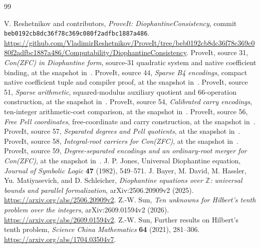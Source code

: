 \documentclass[11pt,a4paper]{article}
\theoremstyle{definition}\newtheorem{definition}[theorem]{Definition}
\theoremstyle{remark}\newtheorem{remark}[theorem]{Remark}
\begin{document}
\begin{thebibliography}{99}
\raggedright
{}
V. Reshetnikov and contributors,
\emph{ProveIt: DiophantineConsistency}, commit
\texttt{beb0192cb8dc36f78c369c080f2adfbc1887a486}.
\url{https://github.com/VladimirReshetnikov/ProveIt/tree/beb0192cb8dc36f78c369c080f2adfbc1887a486/Computability/DiophantineConsistency}.
ProveIt, source 31, \emph{Con(ZFC) in Diophantine form}, source-31
quadratic system and native coefficient binding, at the snapshot in~\cite{repo}.
ProveIt, source 44, \emph{Sparse B4 encodings}, compact native coefficient
tuple and compiler proof, at the snapshot in~\cite{repo}.
ProveIt, source 51, \emph{Sparse arithmetic}, squared-modulus auxiliary
quotient and 66-operation construction, at the snapshot in~\cite{repo}.
ProveIt, source 54, \emph{Calibrated carry encodings}, ten-integer
arithmetic-cost comparison, at the snapshot in~\cite{repo}.
ProveIt, source 56, \emph{Free Pell coordinates}, free-coordinate and
carry construction, at the snapshot in~\cite{repo}.
ProveIt, source 57, \emph{Separated degrees and Pell quotients},
at the snapshot in~\cite{repo}.
ProveIt, source 58, \emph{Integral-root carriers for Con(ZFC)},
at the snapshot in~\cite{repo}.
ProveIt, source 59, \emph{Degree-separated encodings and an ordinary-root
merger for Con(ZFC)}, at the snapshot in~\cite{repo}.
J. P. Jones, Universal Diophantine equation,
\emph{Journal of Symbolic Logic} \textbf{47} (1982), 549--571.
J. Bayer, M. David, M. Hassler, Yu. Matiyasevich, and D. Schleicher,
\emph{Diophantine equations over $\mathbb Z$: universal bounds and
parallel formalization}, arXiv:2506.20909v2 (2025).
\url{https://arxiv.org/abs/2506.20909v2}.
Z.-W. Sun, \emph{Ten unknowns for Hilbert's tenth problem over the
integers}, arXiv:2609.01594v2 (2026).
\url{https://arxiv.org/abs/2609.01594v2}.
Z.-W. Sun, Further results on Hilbert's tenth problem,
\emph{Science China Mathematics} \textbf{64} (2021), 281--306.
\url{https://arxiv.org/abs/1704.03504v7}.
\end{thebibliography}
\end{document}
